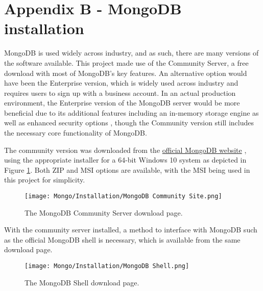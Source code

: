 \begingroup
\renewcommand\thechapter{B}
\titleformat{\chapter}[display]
{\normalfont\huge\bfseries}{}{20pt}{\Huge}
\setcounter{section}{0}
\setcounter{figure}{0} 

\chapter*{Appendix B - MongoDB installation}

MongoDB is used widely across industry, and as such, there are many versions of the software available. 
This project made use of the Community Server, a free download with most of MongoDB's key features. An alternative 
option would have been the Enterprise version, which is widely used across industry and requires users to sign 
up with a business account. In an actual production environment, the Enterprise version of the MongoDB server 
would be more beneficial due to its additional features including an in-memory storage engine as well as enhanced 
security options \autocite{mongodb_mongodb_nodate}, though the Community version still includes the necessary 
core functionality of MongoDB.

\para The community version was downloaded from the \href{https://www.mongodb.com/try/download/community}{official MongoDB website} \autocite{mongodb_try_nodate},
using the appropriate installer for a 64-bit Windows 10 system as depicted in Figure \ref{fig:MongoDownload}. Both ZIP and MSI options
are available, with the MSI being used in this project for simplicity.

\begin{figure}[H]
    \centering
    \texttt{[image: Mongo/Installation/MongoDB Community Site.png]}
    \caption{The MongoDB Community Server download page.\label{fig:MongoDownload}}
\end{figure}

\noindent With the community server installed, a method to interface with MongoDB such as the official 
MongoDB shell is necessary, which is available from the same download page.

\begin{figure}[H]
    \centering
    \texttt{[image: Mongo/Installation/MongoDB Shell.png]}
    \caption{The MongoDB Shell download page.\label{fig:MongoShellDownload}}
\end{figure}

